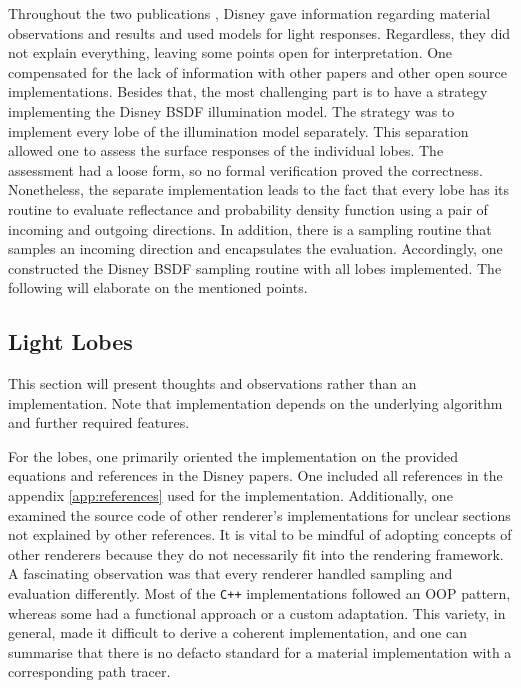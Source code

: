 Throughout the two publications \cite{burley_physically_2012} \cite{burley_extending_2015}, Disney gave information regarding material observations and results and used models for light responses.
Regardless, they did not explain everything, leaving some points open for interpretation.
One compensated for the lack of information with other papers and other open source implementations.
Besides that, the most challenging part is to have a strategy implementing the Disney BSDF illumination model.
The strategy was to implement every lobe of the illumination model separately.
This separation allowed one to assess the surface responses of the individual lobes.
The assessment had a loose form, so no formal verification proved the correctness.
Nonetheless, the separate implementation leads to the fact that every lobe has its routine to evaluate reflectance and probability density function using a pair of incoming and outgoing directions.
In addition, there is a sampling routine that samples an incoming direction and encapsulates the evaluation.
Accordingly, one constructed the Disney BSDF sampling routine with all lobes implemented.
The following will elaborate on the mentioned points.

\subsection*{Light Lobes}

This section will present thoughts and observations rather than an implementation.
Note that implementation depends on the underlying algorithm and further required features.

For the lobes, one primarily oriented the implementation on the provided equations and references in the Disney papers.
One included all references in the appendix \ref{app:references} used for the implementation.
Additionally, one examined the source code of other renderer's implementations for unclear sections not explained by other references.
It is vital to be mindful of adopting concepts of other renderers because they do not necessarily fit into the rendering framework.
A fascinating observation was that every renderer handled sampling and evaluation differently.
Most of the \texttt{C++} implementations followed an OOP pattern, whereas some had a functional approach or a custom adaptation.
This variety, in general, made it difficult to derive a coherent implementation, and one can summarise that there is no defacto standard for a material implementation with a corresponding path tracer.

